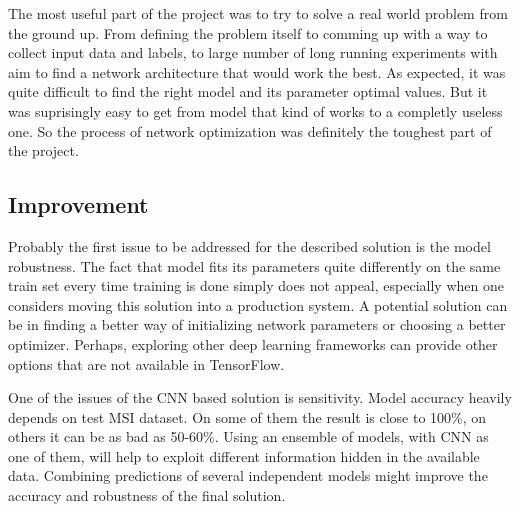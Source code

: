 \documentclass[a4paper]{article}
\begin{document}
The most useful part of the project was to try to solve a real world problem from the ground up.
From defining the problem itself to comming up with a way to collect input data and labels,
to large number of long running experiments with aim to find a network architecture that would work the best.
As expected, it was quite difficult to find the right model and its parameter optimal values.
But it was suprisingly easy to get from model that kind of works to a completly useless one.
So the process of network optimization was definitely the toughest part of the project.

\subsection*{Improvement}

Probably the first issue to be addressed for the described solution is the model robustness.
The fact that model fits its parameters quite differently on the same train set every time
training is done simply does not appeal, especially when one considers moving this solution
into a production system. A potential solution can be in finding a better
way of initializing network parameters or choosing a better optimizer.
Perhaps, exploring other deep learning frameworks
can provide other options that are not available in TensorFlow.

One of the issues of the CNN based solution is sensitivity.
Model accuracy heavily depends on test MSI dataset.
On some of them the result is close to 100\%, on others it can be as bad as 50-60\%.
Using an ensemble of models, with CNN as one of them,
will help to exploit different information hidden in the available data.
Combining predictions of several independent models might improve the accuracy and 
robustness of the final solution.
\end{document}
